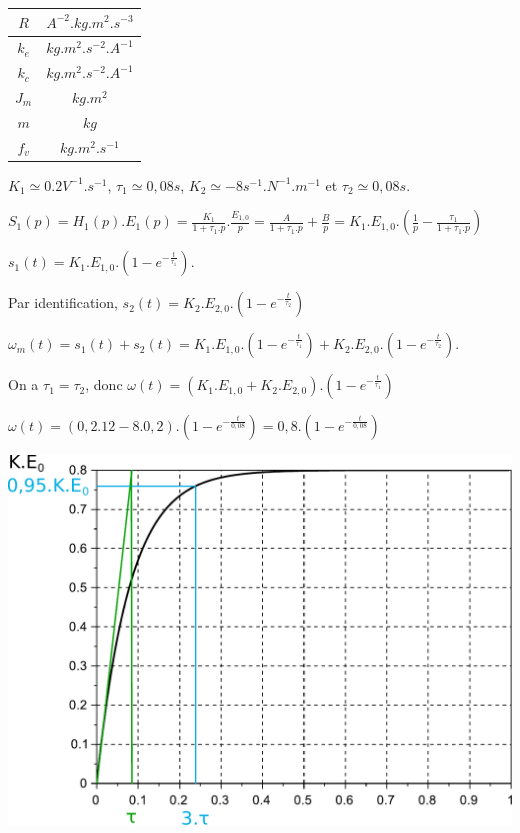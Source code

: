 
\begin{center}
\begin{tabular}{|c|c|}
\hline
$R$ & $A^{-2}.kg.m^2.s^{-3}$ \\
\hline
$k_e$ & $kg.m^2.s^{-2}.A^{-1}$ \\
\hline
$k_c$ & $kg.m^2.s^{-2}.A^{-1}$ \\
\hline
$J_m$ & $kg.m^2$ \\
\hline
$m$ & $kg$ \\
\hline
$f_v$ & $kg.m^2.s^{-1}$\\
\hline
\end{tabular}
\end{center}


$K_1\simeq0.2V^{-1}.s^{-1}$, $\tau_1\simeq0,08s$, $K_2\simeq -8s^{-1}.N^{-1}.m^{-1}$ et $\tau_2\simeq0,08s$.


$S_1(p)=H_1(p).E_1(p)=\frac{K_1}{1+\tau_1.p}.\frac{E_{1,0}}{p}=\frac{A}{1+\tau_1.p}+\frac{B}{p}=K_1.E_{1,0}.\left(\frac{1}{p}-\frac{\tau_1}{1+\tau_1.p}\right)$

$s_1(t)=K_1.E_{1,0}.(1-e^{-\frac{t}{\tau_1}})$.



Par identification, $s_2(t)=K_2.E_{2,0}.(1-e^{-\frac{t}{\tau_2}})$


$\omega_m(t)=s_1(t)+s_2(t)=K_1.E_{1,0}.(1-e^{-\frac{t}{\tau_1}})+K_2.E_{2,0}.(1-e^{-\frac{t}{\tau_2}})$.

On a $\tau_1=\tau_2$, donc $\omega(t)=(K_1.E_{1,0}+K_2.E_{2,0}).(1-e^{-\frac{t}{\tau_1}})$

$\omega(t)=(0,2.12-8.0,2).(1-e^{-\frac{t}{0,08}})=0,8.(1-e^{-\frac{t}{0,08}})$

\begin{center}
 \centering\includegraphics[width=0.9\linewidth]{img/temp_cor}
\end{center}

